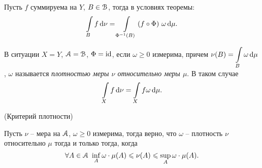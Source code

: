 \begin{corollary}
    Пусть $f$ суммируема на $Y$, $B \in \mathcal{B}$, тогда в условиях теоремы:
\[
    \int\limits_{B}{f \,\mathrm{d}\nu} = \int\limits_{\Phi^{-1}(B)}{(f \circ \Phi)~ \omega \,\mathrm{d}\mu}
.\] 
\end{corollary}

\begin{definition}
    В ситуации $X = Y$, $\mathcal{A} = \mathcal{B}$, $\Phi = \operatorname{id}$, если $\omega \geqslant 0$ измерима,
    причем $\displaystyle \nu(B) = \int\limits_{B}{\omega \,\mathrm{d}\mu}$, $\omega$ называется
    \textit{плотностью меры $\nu$ относительно меры $\mu$}.
    В таком случае
\[
    \int\limits_{X}{f \,\mathrm{d}\nu} = \int\limits_{X}{f \omega \,\mathrm{d}\mu}
.\] 
\end{definition}

\begin{theorem}(Критерий плотности)

    Пусть $\nu$ -- мера на $\mathcal{A}$, $\omega \geqslant 0$ измерима, тогда
    верно, что $\omega$ -- плотность $\nu$ относительно $\mu$ тогда
    и только тогда, когда
\[
    \forall A \in \mathcal{A}~ \inf_{A}{\omega} \cdot \mu(A) \leqslant \nu(A)
    \leqslant \sup_{A}{\omega} \cdot \mu(A)
.\] 
\end{theorem}
